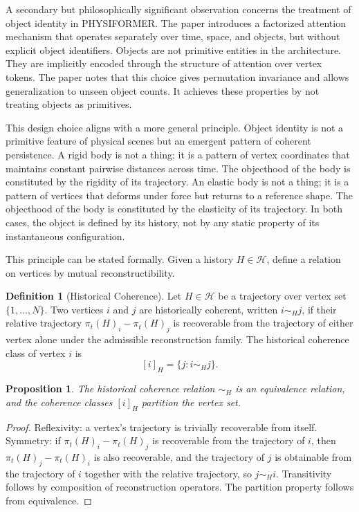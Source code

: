 \documentclass[12pt,oneside]{article}
\newtheorem{proposition}[theorem]{Proposition}
\theoremstyle{definition}
\newtheorem{definition}[theorem]{Definition}
\newcommand{\H}{\mathcal{H}}
\begin{document}
A secondary but philosophically significant observation concerns the treatment of
object identity in PHYSIFORMER. The paper introduces a factorized attention mechanism
that operates separately over time, space, and objects, but without explicit object
identifiers. Objects are not primitive entities in the architecture. They are
implicitly encoded through the structure of attention over vertex tokens. The paper
notes that this choice gives permutation invariance and allows generalization to
unseen object counts. It achieves these properties by not treating objects as primitives.

This design choice aligns with a more general principle. Object identity is not
a primitive feature of physical scenes but an emergent pattern of coherent
persistence. A rigid body is not a thing; it is a pattern of vertex coordinates
that maintains constant pairwise distances across time. The objecthood of the body
is constituted by the rigidity of its trajectory. An elastic body is not a thing;
it is a pattern of vertices that deforms under force but returns to a reference shape.
The objecthood of the body is constituted by the elasticity of its trajectory. In both
cases, the object is defined by its history, not by any static property of its
instantaneous configuration.

This principle can be stated formally. Given a history \(H \in \H\), define a
relation on vertices by mutual reconstructibility.

\begin{definition}[Historical Coherence]
Let \(H \in \H\) be a trajectory over vertex set \(\{1, \ldots, N\}\). Two vertices
\(i\) and \(j\) are historically coherent, written \(i \sim_H j\), if their
relative trajectory \(\pi_t(H)_i - \pi_t(H)_j\) is recoverable from the trajectory
of either vertex alone under the admissible reconstruction family. The historical
coherence class of vertex \(i\) is
\[
[i]_H = \{j : i \sim_H j\}.
\]
\end{definition}

\begin{proposition}
The historical coherence relation \(\sim_H\) is an equivalence relation, and the
coherence classes \([i]_H\) partition the vertex set.
\end{proposition}

\begin{proof}
Reflexivity: a vertex's trajectory is trivially recoverable from itself. Symmetry:
if \(\pi_t(H)_i - \pi_t(H)_j\) is recoverable from the trajectory of \(i\), then
\(\pi_t(H)_j - \pi_t(H)_i\) is also recoverable, and the trajectory of \(j\) is
obtainable from the trajectory of \(i\) together with the relative trajectory, so
\(j \sim_H i\). Transitivity follows by composition of reconstruction operators.
The partition property follows from equivalence.
\end{proof}
\end{document}
